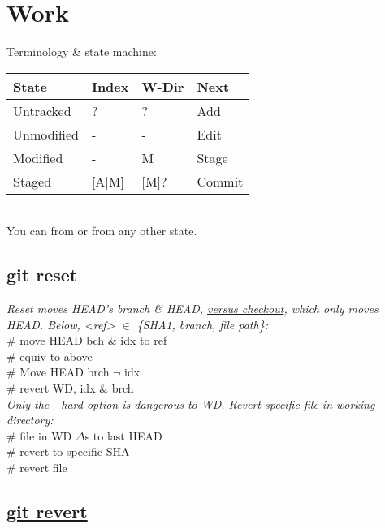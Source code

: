 \section{Work}
Terminology \& state machine: \\
{\scriptsize
\begin{tabular}{l l l l}
    State & Index & W-Dir & Next \\ 
    \hline
    Untracked & ? & ? & Add \\
    Unmodified & - & - & Edit \\
    Modified & - & M & Stage \\
    Staged & [A|M] & [M]? & Commit \\
\end{tabular}
}\\
You can  from  or  from any other state.

\subsection*{git reset}
\textit{Reset moves HEAD's branch \& HEAD, \href{https://stackoverflow.com/questions/3639342/whats-the-difference-between-git-reset-and-git-checkout}{versus checkout}, which only moves HEAD.  Below, <ref> $\in$ \{SHA1, branch, file path\}:}\\
 \# move HEAD bch \& idx to ref\\ 
 \# equiv to above\\
 \# Move HEAD brch $\neg$ idx\\
 \# revert WD, idx \& brch \\[2mm]
\textit{Only the -{}-hard option is dangerous to WD. Revert specific file in working directory:}\\
 \# file in WD $\Delta$s to last HEAD\\
 \# revert to specific SHA \\
 \#  revert file \\

\subsection*{\href{https://git-scm.com/docs/git-revert\#_examples}{git revert}}

